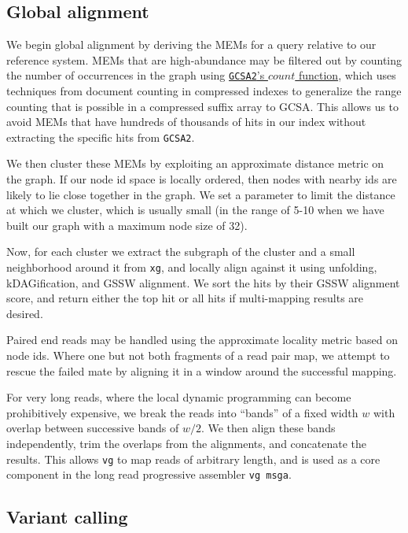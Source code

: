 \documentclass[12pt]{article}
\begin{document}
\subsection{Global alignment}

We begin global alignment by deriving the MEMs for a query relative to our reference system.
MEMs that are high-abundance may be filtered out by counting the number of occurrences in the graph using \href{https://github.com/jltsiren/gcsa2/releases/tag/v0.6}{{\tt GCSA2}'s $count$ function}, which uses techniques from document counting in compressed indexes to generalize the range counting that is possible in a compressed suffix array to GCSA.
This allows us to avoid MEMs that have hundreds of thousands of hits in our index without extracting the specific hits from {\tt GCSA2}.

We then cluster these MEMs by exploiting an approximate distance metric on the graph.
If our node id space is locally ordered, then nodes with nearby ids are likely to lie close together in the graph.
We set a parameter to limit the distance at which we cluster, which is usually small (in the range of 5-10 when we have built our graph with a maximum node size of 32).

Now, for each cluster we extract the subgraph of the cluster and a small neighborhood around it from {\tt xg}, and locally align against it using unfolding, kDAGification, and GSSW alignment.
We sort the hits by their GSSW alignment score, and return either the top hit or all hits if multi-mapping results are desired.

Paired end reads may be handled using the approximate locality metric based on node ids.
Where one but not both fragments of a read pair map, we attempt to rescue the failed mate by aligning it in a window around the successful mapping.

For very long reads, where the local dynamic programming can become prohibitively expensive, we break the reads into ``bands'' of a fixed width $w$ with overlap between successive bands of $w/2$.
We then align these bands independently, trim the overlaps from the alignments, and concatenate the results.
This allows {\tt vg} to map reads of arbitrary length, and is used as a core component in the long read progressive assembler {\tt vg msga}.

\subsection{Variant calling}
\end{document}
